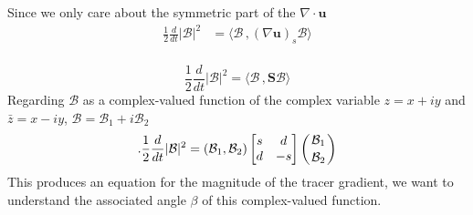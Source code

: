 Since we only care about the symmetric part of the $\nabla \cdot \mathbf{u}$
\begin{align*}
  \frac{1}{2}\frac{d}{dt}|\mathcal{B}|^2  &= \langle \mathcal{B}\,, \left(\nabla \mathbf{u}\right)_{s}  \mathcal{B}\rangle   \\
\end{align*}


\begin{equation*}
  \frac{1}{2}\frac{d}{dt}|\mathcal{B}|^2  = \langle \mathcal{B}\,, \mathbf{S}  \mathcal{B}\rangle   
\end{equation*}
Regarding $\mathcal{B}$ as a complex-valued function of the complex variable $z = x + iy$ and $\bar{z} = x - iy$, $\mathcal{B} = \mathcal{B}_{1} + i\mathcal{B}_{2}$
\begin{equation}. 
  \label{eqn:three}
  \frac{1}{2}\frac{d}{dt}|\mathcal{B}|^2  = \left(\mathcal{B}_{1},\mathcal{B}_{2}\right) 
      \begin{bmatrix}
	s & d \\
	d & -s
      \end{bmatrix} \left(\mathcal{B}_{1} \atop \mathcal{B}_{2} \right)
\end{equation}
This produces an equation for the magnitude of the tracer gradient, we want to understand the associated angle $\beta$ of this complex-valued function.

